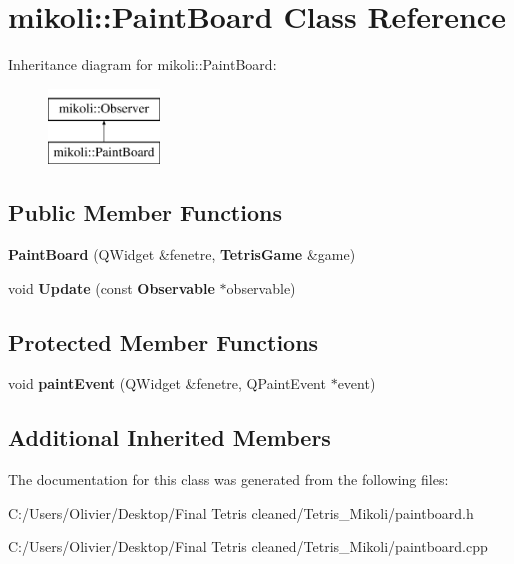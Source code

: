 \section{mikoli\+:\+:Paint\+Board Class Reference}
\label{classmikoli_1_1_paint_board}
Inheritance diagram for mikoli\+:\+:Paint\+Board\+:\begin{figure}[H]
\begin{center}
\leavevmode
\includegraphics[height=2.000000cm]{classmikoli_1_1_paint_board}
\end{center}
\end{figure}
\subsection*{Public Member Functions}
\begin{DoxyCompactItemize}
\item 
\mbox{\label{classmikoli_1_1_paint_board_ad976d76f5064307ea77373e107d6424c}} 
{\bfseries Paint\+Board} (Q\+Widget \&fenetre, \textbf{ Tetris\+Game} \&game)
\item 
\mbox{\label{classmikoli_1_1_paint_board_a6ab43b112e7302f435a1ded710c9dcab}} 
void {\bfseries Update} (const \textbf{ Observable} $\ast$observable)
\end{DoxyCompactItemize}
\subsection*{Protected Member Functions}
\begin{DoxyCompactItemize}
\item 
\mbox{\label{classmikoli_1_1_paint_board_a6ac5cefd98cf2111ef231f842319948c}} 
void {\bfseries paint\+Event} (Q\+Widget \&fenetre, Q\+Paint\+Event $\ast$event)
\end{DoxyCompactItemize}
\subsection*{Additional Inherited Members}


The documentation for this class was generated from the following files\+:\begin{DoxyCompactItemize}
\item 
C\+:/\+Users/\+Olivier/\+Desktop/\+Final Tetris cleaned/\+Tetris\+\_\+\+Mikoli/paintboard.\+h\item 
C\+:/\+Users/\+Olivier/\+Desktop/\+Final Tetris cleaned/\+Tetris\+\_\+\+Mikoli/paintboard.\+cpp\end{DoxyCompactItemize}
